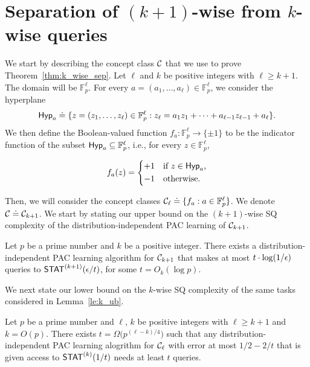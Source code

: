 \section{Separation of $(k+1)$-wise from $k$-wise queries}\label{sec:pf_sep}
\newcommand{\ind}{\mathbbm{1}}

We start by describing the concept class $\mathcal{C}$ that we use to prove Theorem~\ref{thm:k_wise_sep}. Let $\ell$ and $k$ be positive integers with $\ell \geq k+1$. The domain will be $\mathbb{F}_p^{\ell}$. For every $a = (a_1,\dots, a_{\ell}) \in \mathbb{F}_p^{\ell}$, we consider the hyperplane
$$ \mathsf{Hyp}_a \doteq \{ z = (z_1,\dots,z_{\ell}) \in \mathbb{F}_p^{\ell}: z_{\ell} = a_1 z_1 + \dots + a_{\ell-1} z_{\ell-1} + a_{\ell}\}.$$
We then define the Boolean-valued function $f_a: \mathbb{F}_p^{\ell} \to \{\pm 1\}$ to be the indicator function of the subset $\mathsf{Hyp}_a \subseteq \mathbb{F}_p^{\ell}$, i.e., for every $z \in \mathbb{F}_p^{\ell}$,

\[
 f_a(z) = \begin{dcases*}
        +1  & if $z \in \Hyp_a$,\\
        -1 & otherwise.
        \end{dcases*}
\]

Then, we will consider the concept classes $\mathcal{C}_{\ell} \doteq \{f_a: a \in \mathbb{F}_p^{\ell}\}$. We denote $\mathcal{C} \doteq \mathcal{C}_{k+1}$. We start by stating our upper bound on the $(k+1)$-wise SQ complexity of the distribution-independent PAC learning of $\mathcal{C}_{k+1}$.

\begin{lem}\label{le:k_ub}
Let $p$ be a prime number and $k$ be a positive integer. There exists a distribution-independent PAC learning algorithm for $\mathcal{C}_{k+1}$ that makes at most $t \cdot \log(1/\epsilon) $ queries to $\mathsf{STAT}^{(k+1)}(\epsilon/t)$, for some $t = O_k(\log{p})$.
\end{lem}

We next state our lower bound on the $k$-wise SQ complexity of the same tasks considered in Lemma~\ref{le:k_ub}.

\begin{lem}\label{le:k_plus_1_lb}
 Let $p$ be a prime number and $\ell$, $k$ be positive integers with $\ell \geq k+1$ and $k = O(p)$. There exists $t =  \Omega\big(p^{(\ell-k)/4}\big)$ such that any distribution-independent PAC learning alogrithm for $\mathcal{C}_{\ell}$ with error at most $1/2-2/t$ that is given access to $\mathsf{STAT}^{(k)}(1/t)$ needs at least $t$ queries.
\end{lem}

